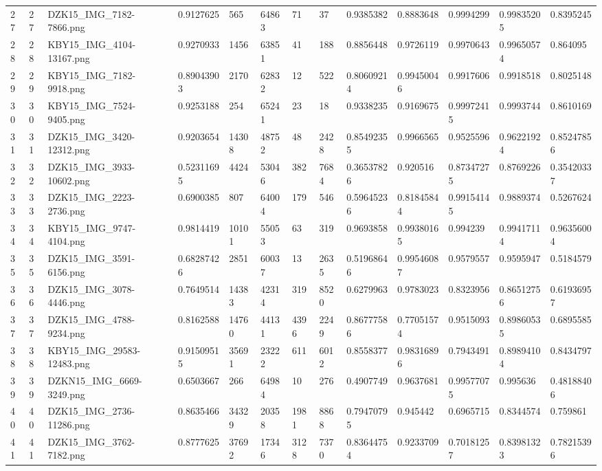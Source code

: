 \documentclass[11pt, a4paper, twoside]{report}
\begin{document}
\begin{longtable}[c]{@{}lllllllllllll@{}}
27 & 27 & DZK15\_IMG\_7182-7866.png & 0.9127625 & 565 & 64863 & 71 & 37 & 0.9385382 & 0.8883648 & 0.9994299 & 0.99835205 & 0.8395245 \\
28 & 28 & KBY15\_IMG\_4104-13167.png & 0.9270933 & 1456 & 63851 & 41 & 188 & 0.8856448 & 0.9726119 & 0.9970643 & 0.99650574 & 0.864095 \\
29 & 29 & KBY15\_IMG\_7182-9918.png & 0.89043903 & 2170 & 62832 & 12 & 522 & 0.80609214 & 0.99450046 & 0.9917606 & 0.9918518 & 0.8025148 \\
30 & 30 & KBY15\_IMG\_7524-9405.png & 0.9253188 & 254 & 65241 & 23 & 18 & 0.9338235 & 0.9169675 & 0.99972415 & 0.9993744 & 0.8610169 \\
31 & 31 & DZK15\_IMG\_3420-12312.png & 0.9203654 & 14308 & 48752 & 48 & 2428 & 0.85492355 & 0.9966565 & 0.9525596 & 0.96221924 & 0.85247856 \\
32 & 32 & DZK15\_IMG\_3933-10602.png & 0.52311695 & 4424 & 53046 & 382 & 7684 & 0.36537826 & 0.920516 & 0.87347275 & 0.8769226 & 0.35420337 \\
33 & 33 & DZK15\_IMG\_2223-2736.png & 0.6900385 & 807 & 64004 & 179 & 546 & 0.59645236 & 0.81845844 & 0.99154145 & 0.9889374 & 0.5267624 \\
34 & 34 & KBY15\_IMG\_9747-4104.png & 0.9814419 & 10101 & 55053 & 63 & 319 & 0.9693858 & 0.99380165 & 0.994239 & 0.99417114 & 0.96356004 \\
35 & 35 & DZK15\_IMG\_3591-6156.png & 0.68287426 & 2851 & 60037 & 13 & 2635 & 0.51968646 & 0.99546087 & 0.9579557 & 0.9595947 & 0.5184579 \\
36 & 36 & DZK15\_IMG\_3078-4446.png & 0.7649514 & 14383 & 42314 & 319 & 8520 & 0.6279963 & 0.9783023 & 0.8323956 & 0.86512756 & 0.61936957 \\
37 & 37 & DZK15\_IMG\_4788-9234.png & 0.8162588 & 14760 & 44131 & 4396 & 2249 & 0.86777586 & 0.77051574 & 0.9515093 & 0.89860535 & 0.6895585 \\
38 & 38 & KBY15\_IMG\_29583-12483.png & 0.91509515 & 35691 & 23222 & 611 & 6012 & 0.8558377 & 0.98316896 & 0.7943491 & 0.89894104 & 0.8434797 \\
39 & 39 & DZKN15\_IMG\_6669-3249.png & 0.6503667 & 266 & 64984 & 10 & 276 & 0.4907749 & 0.9637681 & 0.99577075 & 0.995636 & 0.48188406 \\
40 & 40 & DZK15\_IMG\_2736-11286.png & 0.8635466 & 34329 & 20358 & 1981 & 8868 & 0.79470795 & 0.945442 & 0.6965715 & 0.8344574 & 0.759861 \\
41 & 41 & DZK15\_IMG\_3762-7182.png & 0.8777625 & 37692 & 17346 & 3128 & 7370 & 0.83644754 & 0.9233709 & 0.70181257 & 0.83981323 & 0.78215396 \\

\end{longtable}
\end{document}
